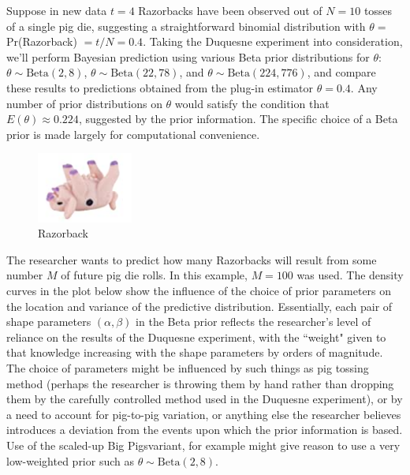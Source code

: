 \documentclass[12pt, a4paper]{article}
\begin{document}
\noindent Suppose in new data $t=4$ Razorbacks have been observed out of $N=10$ tosses of a single pig die, suggesting a straightforward binomial distribution with $\theta =$ Pr(Razorback) $= t/N = 0.4$. Taking the Duquesne experiment into consideration, we'll perform Bayesian prediction using various Beta prior distributions for $\theta$: $\theta\sim\text{Beta}(2,8)$, $\theta\sim\text{Beta}(22,78)$, and $\theta\sim\text{Beta}(224,776)$, and compare these results to predictions obtained from the plug-in estimator $\theta = 0.4$.   Any number of prior distributions on $\theta$ would satisfy the condition that $E(\theta) \approx 0.224$, suggested by the prior information.  The specific choice of a Beta prior is made largely for computational convenience.\\

\begin{figure}
  \centering
    \includegraphics[width=0.28\textwidth]{./Graphics/PassThePigs/Razorback}
  \caption{Razorback}
\end{figure}

\noindent The researcher wants to predict how many Razorbacks will result from some number $M$ of future pig die rolls.  In this example, $M=100$ was used.  The density curves in the plot below show the influence of the choice of prior parameters on the location and variance of the predictive distribution.  Essentially, each pair of shape parameters $(\alpha,\beta)$ in the Beta prior reflects the researcher's level of reliance on the results of the Duquesne experiment, with the ``weight" given to that knowledge increasing with the shape parameters by orders of magnitude.  The choice of parameters might be influenced by such things as pig tossing method (perhaps the researcher is throwing them by hand rather than dropping them by the carefully controlled method used in the Duquesne experiment), or by a need to account for pig-to-pig variation, or anything else the researcher believes introduces a deviation from the events upon which the prior information is based.  Use of the scaled-up Big Pigs\texttrademark  variant, for example might give reason to use a very low-weighted prior such as $\theta\sim\text{Beta}(2,8)$.\\
\end{document}
